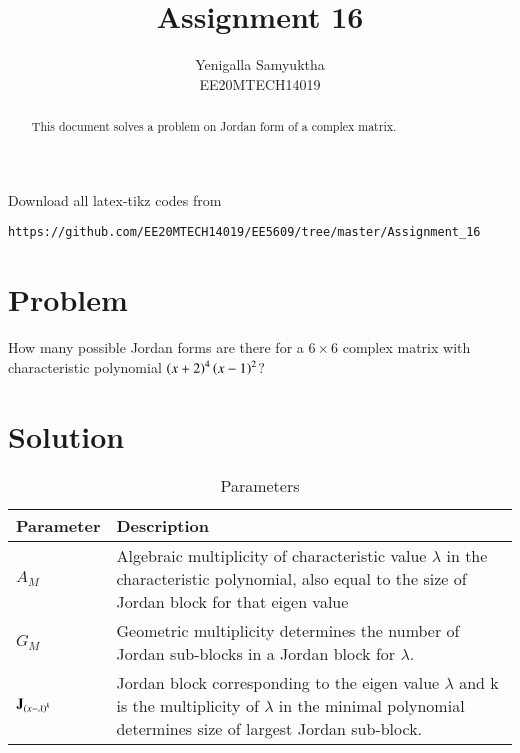 \documentclass[journal,12pt,twocolumn]{IEEEtran}
\numberwithin{table}{section}
\begin{document}
     \def\rightbox#1{\makebox[0in][r]{#1}}
     \def\centbox#1{\makebox[0in]{#1}}
     \def\topbox#1{\raisebox{-\baselineskip}[0in][0in]{#1}}
     \def\midbox#1{\raisebox{-0.5\baselineskip}[0in][0in]{#1}}
\vspace{3cm}
\title{Assignment 16}
\author{Yenigalla Samyuktha\\EE20MTECH14019}
\maketitle
\newpage
\bigskip
\renewcommand{\thefigure}{\theenumi}
\renewcommand{\thetable}{1}
\setlength{\tabcolsep}{20pt}
\renewcommand{\arraystretch}{1.5}
\begin{abstract}
This document solves a problem on Jordan form of a complex matrix.
\end{abstract}
Download all latex-tikz codes from 
%
\begin{lstlisting}
https://github.com/EE20MTECH14019/EE5609/tree/master/Assignment_16
\end{lstlisting}
%
\section{Problem}
How many possible Jordan forms are there for a $6\times6$ complex matrix with characteristic polynomial $\left(x+2\right)^4\left(x-1\right)^2$?
\section{Solution}
\begin{table}[ht!]
\begin{center}
\begin{tabular}{|p{2cm}|p{5.5cm}|}
\hline
\textbf{Parameter} & \textbf{Description}
\\ [0.5ex] 
\hline
$A_M$ & Algebraic multiplicity of characteristic value $\lambda$ in the characteristic polynomial, also equal to the size of Jordan block for that eigen value
\\ [0.5ex] 
\hline
$G_M$ & Geometric multiplicity determines the number of Jordan sub-blocks in a Jordan block for $\lambda$.
\\ [0.5ex] 
\hline
$\mathbf{J}_{\left(x-\lambda\right)^k}$ & Jordan block corresponding to the eigen value $\lambda$ and k is the multiplicity of $\lambda$ in the minimal polynomial determines size of largest Jordan sub-block.
\\ [0.5ex] 
\hline
\end{tabular}
\caption{Parameters}
\label{table:1}
\end{center}
\vspace{-0.5cm}
\end{table}
\end{document}
